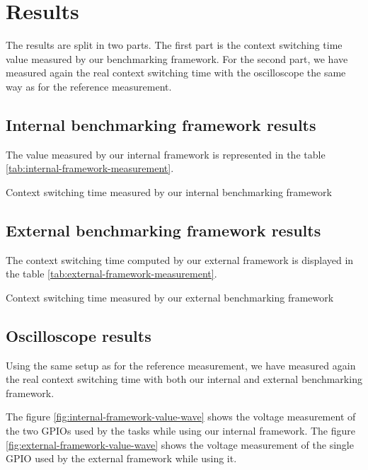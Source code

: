 \section{Results}

The results are split in two parts.
The first part is the context switching time value measured by our benchmarking framework.
For the second part, we have measured again the real context switching time with the oscilloscope the same way as for the reference measurement.

\subsection{Internal benchmarking framework results}
The value measured by our internal framework is represented in the table \ref{tab:internal-framework-measurement}.

\begin{table}[!ht]
  \centering
  
  \caption{Context switching time measured by our internal benchmarking framework}
  \label{tab:internal-framework-measurement}
  \end{table}

\subsection{External benchmarking framework results}
The context switching time computed by our external framework is displayed in the table \ref{tab:external-framework-measurement}.

\begin{table}[!ht]
  \centering
  
  \caption{Context switching time measured by our external benchmarking framework}
  \label{tab:external-framework-measurement}
\end{table}

\subsection{Oscilloscope results}
Using the same setup as for the reference measurement, we have measured again the real context switching time with both our internal and external benchmarking framework.

The figure \ref{fig:internal-framework-value-wave} shows the voltage measurement of the two GPIOs used by the tasks while using our internal framework.
The figure \ref{fig:external-framework-value-wave} shows the voltage measurement of the single GPIO used by the external framework while using it.

